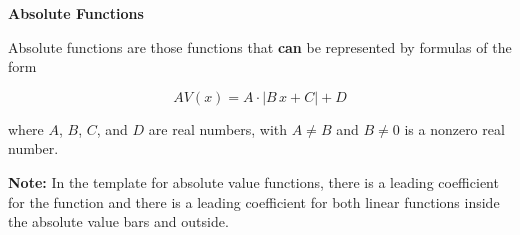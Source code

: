 \documentclass{ximera}
\begin{document}
\begin{definition} \textbf{\textcolor{green!50!black}{Absolute Functions}}

Absolute functions are those functions that \textbf{\textcolor{purple!85!blue}{can}} be represented by formulas of the form


\[      AV(x) = A \cdot | B \, x + C| + D   \]

where $A$, $B$, $C$, and $D$ are real numbers, with $A \ne B$ and $B \ne 0$ is a nonzero real number.


\end{definition}


\textbf{Note:}  In the template for absolute value functions, there is a leading coefficient for the function and there is a leading coefficient for both linear functions inside the absolute value bars and outside. 
\end{document}
